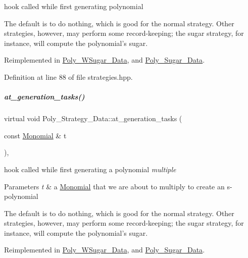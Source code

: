 hook called while first generating polynomial 

The default is to do nothing, which is good for the normal strategy. Other strategies, however, may perform some record-\/keeping; the sugar strategy, for instance, will compute the polynomial's sugar. 

Reimplemented in \hyperlink{group__strategygroup_ac07ee9ee15bd97e5e8befb3f6cec3929}{Poly\+\_\+\+W\+Sugar\+\_\+\+Data}, and \hyperlink{group__strategygroup_ada533e5c56d7f53207a5e8093414dfb3}{Poly\+\_\+\+Sugar\+\_\+\+Data}.



Definition at line 88 of file strategies.\+hpp.

\mbox{\label{group__strategygroup_a6683749a5fb30b6f91075a28899fbfe7}} 
\subparagraph{\texorpdfstring{at\+\_\+generation\+\_\+tasks()}{at\_generation\_tasks()}\hspace{0.1cm}{\footnotesize\ttfamily [2/2]}}
{\footnotesize\ttfamily virtual void Poly\+\_\+\+Strategy\+\_\+\+Data\+::at\+\_\+generation\+\_\+tasks (\begin{DoxyParamCaption}\item[{const \hyperlink{group__polygroup_class_monomial}{Monomial} \&}]{t }\end{DoxyParamCaption})\hspace{0.3cm}{\ttfamily [inline]}, {\ttfamily [virtual]}}



hook called while first generating a polynomial {\itshape multiple} 


\begin{DoxyParams}{Parameters}
{\em t} & a \hyperlink{group__polygroup_class_monomial}{Monomial} that we are about to multiply to create an s-\/polynomial\\
\hline
\end{DoxyParams}
The default is to do nothing, which is good for the normal strategy. Other strategies, however, may perform some record-\/keeping; the sugar strategy, for instance, will compute the polynomial's sugar. 

Reimplemented in \hyperlink{group__strategygroup_ac58bd8d30e7e10dbbe8e86b1d9d04376}{Poly\+\_\+\+W\+Sugar\+\_\+\+Data}, and \hyperlink{group__strategygroup_aa80c660f10b1c5d0dd2a305d598685f5}{Poly\+\_\+\+Sugar\+\_\+\+Data}.



